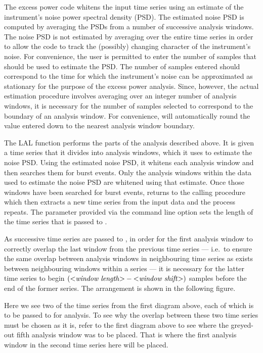 The excess power code whitens the input time series using an estimate of
the instrument's noise power spectral density (PSD).  The estimated noise
PSD is computed by averaging the PSDs from a number of successive analysis
windows.  The noise PSD is not estimated by averaging over the entire time
series in order to allow the code to track the (possibly) changing
character of the instrument's noise.  For convenience, the user is
permitted to enter the number of samples that should be used to estimate
the PSD.  The number of samples entered should correspond to the time for
which the instrument's noise can be approximated as stationary for the
purpose of the excess power analysis.  Since, however, the actual
estimation procedure involves averaging over an integer number of analysis
windows, it is necessary for the number of samples selected to correspond
to the boundary of an analysis window.  For convenience,
 will automatically round the value entered down to
the nearest analysis window boundary.

The LAL function  performs the parts of the analysis
described above.  It is given a time series that it divides into analysis
windows, which it uses to estimate the noise PSD.  Using the estimated
noise PSD, it whitens each analysis window and then searches them for burst
events.  Only the analysis windows within the data used to estimate the
noise PSD are whitened using that estimate.  Once those windows have been
searched for burst events,  returns to the calling
procedure which then extracts a new time series from the input data and the
process repeats.  The parameter provided via the command line option
 sets the length of the time series that is
passed to .

As successive time series are passed to , in order for
the first analysis window to correctly overlap the last window from the
previous time series --- i.e.\ to ensure the same overlap between analysis
windows in neighbouring time series as exists between neighbouring windows
within a series --- it is necessary for the latter time series to begin
$(\mbox{$<$\textit{window length}$>$} - \mbox{$<$\textit{window shift}$>$})$ samples before
the end of the former series.  The arrangement is shown in the following
figure.
\begin{center}

\end{center}
Here we see two of the time series from the first diagram above, each of
which is to be passed to  for analysis.  To see why
the overlap between these two time series must be chosen as it is, refer to
the first diagram above to see where the greyed-out fifth analysis window
was to be placed.  That is where the first analysis window in the second
time series here will be placed.

